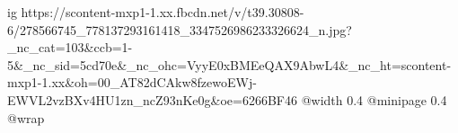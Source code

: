  
 
 
 
 

\ifcmt
  ig https://scontent-mxp1-1.xx.fbcdn.net/v/t39.30808-6/278566745_778137293161418_3347526986233326624_n.jpg?_nc_cat=103&ccb=1-5&_nc_sid=5cd70e&_nc_ohc=VyyE0xBMEeQAX9AbwL4&_nc_ht=scontent-mxp1-1.xx&oh=00_AT82dCAkw8fzewoEWj-EWVL2vzBXv4HU1zn_ncZ93nKe0g&oe=6266BF46
  @width 0.4
  @minipage 0.4
  @wrap \parpic[r]
\fi
